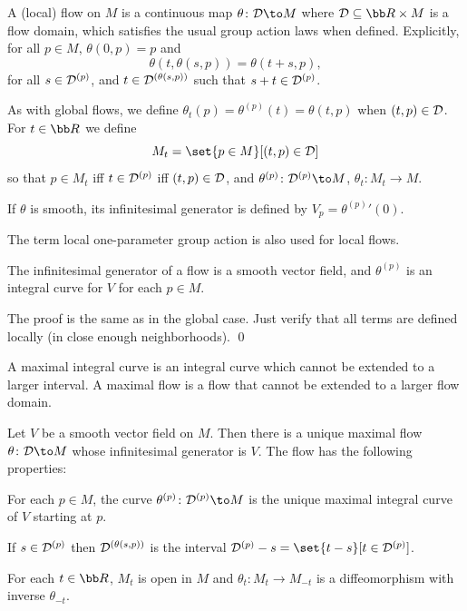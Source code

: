     A {\emphcolor (local) flow} on $M$ is a continuous map $\theta\colon\D\to M$ where $\D\subseteq\bR\times M$ is a flow domain, which satisfies the usual group action laws
    when defined.
    Explicitly, for all $p\in M$, $\theta(0,p)=p$ and
    $$ \theta(t,\theta(s,p)) = \theta(t+s,p) , $$
    for all $s\in{{\cal D}}^{(p)}$, and $t\in{{\cal D}}^{(\theta(s,p))}$ such that $s+t\in{{\cal D}}^{(p)}$.

    As with global flows, we define $\theta_t(p)=\theta^{(p)}(t)=\theta(t,p)$ when $(t,p)\in{{\cal D}}$.
    For $t\in\bR$ we define
    $$ M_t = \set{p\in M}[(t,p)\in\D] $$
    so that $p\in M_t$ iff $t\in{{\cal D}}^{(p)}$ iff $(t,p)\in{{\cal D}}$, and $\theta^{(p)}\colon\D^{(p)}\to M$, $\theta_t\colon M_t\to M$.

    If $\theta$ is smooth, its {\emphcolor infinitesimal generator} is defined by $V_p={\theta^{(p)}}'(0)$.

\edefn

\bnote

    The term {\emphcolor local one-parameter group action} is also used for local flows.

\enote

\bprop

    The infinitesimal generator of a flow is a smooth vector field, and $\theta^{(p)}$ is an integral curve for $V$ for each $p\in M$.

\eprop

\bproof

    The proof is the same as in the global case.
    Just verify that all terms are defined locally (in close enough neighborhoods).
    \qed

\eproof

\bdefn

    A {\emphcolor maximal integral curve} is an integral curve which cannot be extended to a larger interval.
    A {\emphcolor maximal flow} is a flow that cannot be extended to a larger flow domain.

\edefn

\bthrm[title=Fundamental theorem on flows]

    Let $V$ be a smooth vector field on $M$.
    Then there is a unique maximal flow $\theta\colon\D\to M$ whose infinitesimal generator is $V$.
    The flow has the following properties:
    \benum
        \item For each $p\in M$, the curve $\theta^{(p)}\colon\D^{(p)}\to M$ is the unique maximal integral curve of $V$ starting at $p$.
        \item If $s\in{{\cal D}}^{(p)}$ then ${{\cal D}}^{(\theta(s,p))}$ is the interval $\D^{(p)}-s=\set{t-s}[t\in\D^{(p)}]$.
        \item For each $t\in\bR$, $M_t$ is open in $M$ and $\theta_t\colon M_t\to M_{-t}$ is a diffeomorphism with inverse $\theta_{-t}$.
    \eenum

